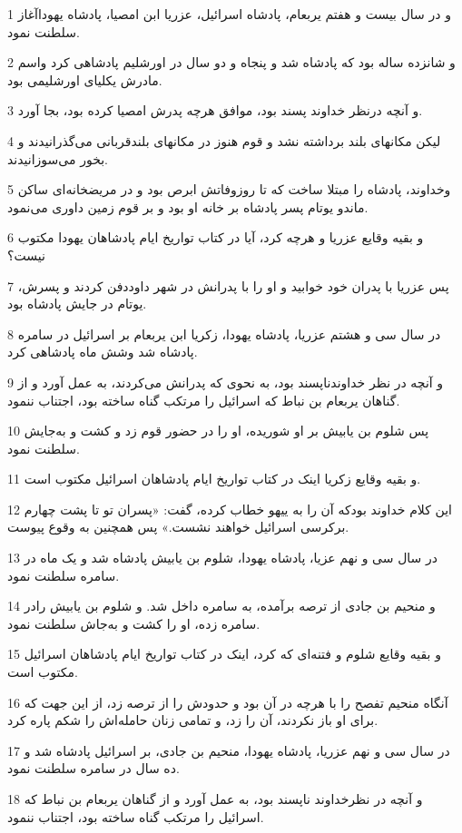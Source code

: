 \par 1 و در سال بیست و هفتم یربعام، پادشاه اسرائیل، عزریا ابن امصیا، پادشاه یهوداآغاز سلطنت نمود.
\par 2 و شانزده ساله بود که پادشاه شد و پنجاه و دو سال در اورشلیم پادشاهی کرد واسم مادرش یکلیای اورشلیمی بود.
\par 3 و آنچه درنظر خداوند پسند بود، موافق هر‌چه پدرش امصیا کرده بود، بجا آورد.
\par 4 لیکن مکانهای بلند برداشته نشد و قوم هنوز در مکانهای بلندقربانی می‌گذرانیدند و بخور می‌سوزانیدند.
\par 5 وخداوند، پادشاه را مبتلا ساخت که تا روزوفاتش ابرص بود و در مریضخانه‌ای ساکن ماندو یوتام پسر پادشاه بر خانه او بود و بر قوم زمین داوری می‌نمود.
\par 6 و بقیه وقایع عزریا و هرچه کرد، آیا در کتاب تواریخ ایام پادشاهان یهودا مکتوب نیست؟
\par 7 پس عزریا با پدران خود خوابید و او را با پدرانش در شهر داوددفن کردند و پسرش، یوتام در جایش پادشاه بود.
\par 8 در سال سی و هشتم عزریا، پادشاه یهودا، زکریا ابن یربعام بر اسرائیل در سامره پادشاه شد وشش ماه پادشاهی کرد.
\par 9 و آنچه در نظر خداوندناپسند بود، به نحوی که پدرانش می‌کردند، به عمل آورد و از گناهان یربعام بن نباط که اسرائیل را مرتکب گناه ساخته بود، اجتناب ننمود.
\par 10 پس شلوم بن یابیش بر او شوریده، او را در حضور قوم زد و کشت و به‌جایش سلطنت نمود.
\par 11 و بقیه وقایع زکریا اینک در کتاب تواریخ ایام پادشاهان اسرائیل مکتوب است.
\par 12 این کلام خداوند بودکه آن را به ییهو خطاب کرده، گفت: «پسران تو تا پشت چهارم برکرسی اسرائیل خواهند نشست.» پس همچنین به وقوع پیوست.
\par 13 در سال سی و نهم عزیا، پادشاه یهودا، شلوم بن یابیش پادشاه شد و یک ماه در سامره سلطنت نمود.
\par 14 و منحیم بن جادی از ترصه برآمده، به سامره داخل شد. و شلوم بن یابیش رادر سامره زده، او را کشت و به‌جاش سلطنت نمود.
\par 15 و بقیه وقایع شلوم و فتنه‌ای که کرد، اینک در کتاب تواریخ ایام پادشاهان اسرائیل مکتوب است.
\par 16 آنگاه منحیم تفصح را با هر‌چه در آن بود و حدودش را از ترصه زد، از این جهت که برای او باز نکردند، آن را زد، و تمامی زنان حامله‌اش را شکم پاره کرد.
\par 17 در سال سی و نهم عزریا، پادشاه یهودا، منحیم بن جادی، بر اسرائیل پادشاه شد و ده سال در سامره سلطنت نمود.
\par 18 و آنچه در نظرخداوند ناپسند بود، به عمل آورد و از گناهان یربعام بن نباط که اسرائیل را مرتکب گناه ساخته بود، اجتناب ننمود.
